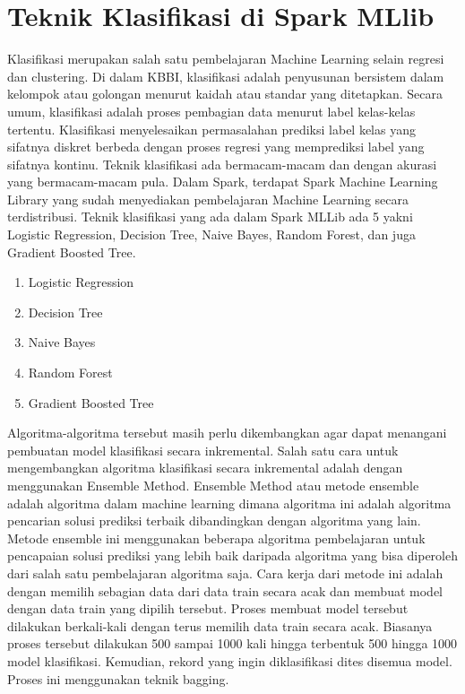 \section{Teknik Klasifikasi di Spark MLlib}
\label{sec:klasifikasi}
Klasifikasi merupakan salah satu pembelajaran Machine Learning selain regresi dan clustering. Di dalam KBBI, klasifikasi adalah penyusunan bersistem dalam kelompok atau golongan menurut kaidah atau standar yang ditetapkan. Secara umum, klasifikasi adalah proses pembagian data menurut label kelas-kelas tertentu. Klasifikasi menyelesaikan permasalahan prediksi label kelas yang sifatnya diskret berbeda dengan proses regresi yang memprediksi label yang sifatnya kontinu. Teknik klasifikasi ada bermacam-macam dan dengan akurasi yang bermacam-macam pula. Dalam Spark, terdapat Spark Machine Learning Library yang sudah menyediakan pembelajaran Machine Learning secara terdistribusi. Teknik klasifikasi yang ada dalam Spark MLLib ada 5 yakni Logistic Regression, Decision Tree, Naive Bayes, Random Forest, dan juga Gradient Boosted Tree.
\begin{enumerate}
\item Logistic Regression
\item Decision Tree
\item Naive Bayes
\item Random Forest
\item Gradient Boosted Tree
\end{enumerate}
Algoritma-algoritma tersebut masih perlu dikembangkan agar dapat menangani pembuatan model klasifikasi secara inkremental. Salah satu cara untuk mengembangkan algoritma klasifikasi secara inkremental adalah dengan menggunakan Ensemble Method. Ensemble Method atau metode ensemble adalah algoritma dalam machine learning dimana algoritma ini adalah algoritma pencarian solusi prediksi terbaik dibandingkan dengan algoritma yang lain. Metode ensemble ini menggunakan beberapa algoritma pembelajaran untuk pencapaian solusi prediksi yang lebih baik daripada algoritma yang bisa diperoleh dari salah satu pembelajaran algoritma saja. Cara kerja dari metode ini adalah dengan memilih sebagian data dari data train secara acak dan membuat model dengan data train yang dipilih tersebut. Proses membuat model tersebut dilakukan berkali-kali dengan terus memilih data train secara acak. Biasanya proses tersebut dilakukan 500 sampai 1000 kali hingga terbentuk 500 hingga 1000 model klasifikasi. Kemudian, rekord yang ingin diklasifikasi dites disemua model. Proses ini menggunakan teknik bagging.

